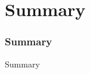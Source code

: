 \section{Summary}

\begin{frame}
    \frametitle{Summary}
    \begin{block}{Summary}
    \end{block}
\end{frame}